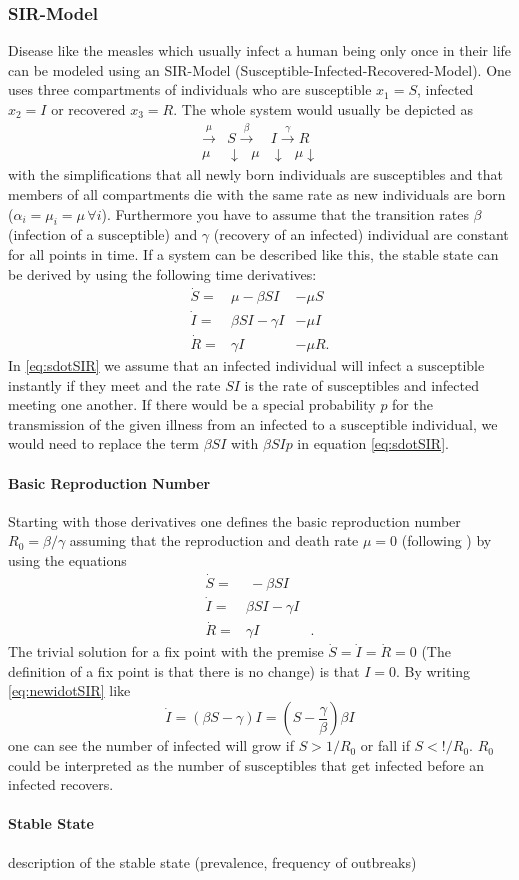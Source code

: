\subsubsection{SIR-Model}
Disease like the measles which usually infect a human being only once in their life can be modeled using an SIR-Model (Susceptible-Infected-Recovered-Model). One uses three compartments of individuals who are susceptible $x_1 = S$, infected $x_2=I$ or recovered $x_3=R$. The whole system would usually be depicted as 
\begin{eqnarray}
\xrightarrow{\mu} &S \xrightarrow{\beta} &I  \xrightarrow{\gamma} R  \\
{\mu} & \downarrow \text{         }\mu &\downarrow \text{  } {\mu} \downarrow \nonumber
\end{eqnarray}
with the simplifications that all newly born individuals are susceptibles and that members of all compartments die with the same rate as new individuals are born ($\alpha_i = \mu_i = \mu\, \forall i$). Furthermore you have to assume that the transition rates $\beta$ (infection of a susceptible) and $\gamma$ (recovery of an infected) individual are constant for all points in time.
If a system can be described like this, the stable state can be derived by using the following time derivatives:
\begin{eqnarray}
\dot{S} =& \mu -\beta SI &-  \mu S  \label{eq:sdotSIR}\\ 
\dot{I} =& \beta SI - \gamma I  &-\mu I \\
\dot{R} =& \gamma I & -\mu R.
\end{eqnarray}
In \ref{eq:sdotSIR} we assume that an infected individual will infect a susceptible instantly if they meet and the rate $SI$ is the rate of susceptibles and infected meeting one another. If there would be a special probability $p$ for the transmission of the given illness from an infected to a susceptible individual, we would need to replace the term $\beta SI$ with $\beta S I p$ in equation \ref{eq:sdotSIR}.
\paragraph{Basic Reproduction Number}
Starting with those derivatives one defines the basic reproduction number $R_0=\beta / \gamma$ assuming that the reproduction and death rate $\mu=0$ (following \citep{AND92}) by using the equations
\begin{eqnarray}
\dot{S} =& \ -\beta SI &  \label{eq:newsdotSIR}\\ 
\dot{I} =& \beta SI - \gamma I  & \label{eq:newidotSIR}\\
\dot{R} =& \gamma I &.
\end{eqnarray}
The trivial solution for a fix point with the premise $\dot{S} = \dot{I} =\dot{R} = 0$ (The definition of a fix point is that there is no change) is that $I=0$. By writing \ref{eq:newidotSIR} like 
\begin{equation}
\dot{I} = (\beta S -\gamma) I = \left( S-\frac{\gamma}{\beta} \right) \beta I
\end{equation}
one can see the number of infected will grow if $S > 1/R_0$ or fall if $S < !/R_0$. $R_0$ could be interpreted as the number of susceptibles that get infected before an infected recovers.
\paragraph{Stable State}
description of the stable state (prevalence, frequency of outbreaks)